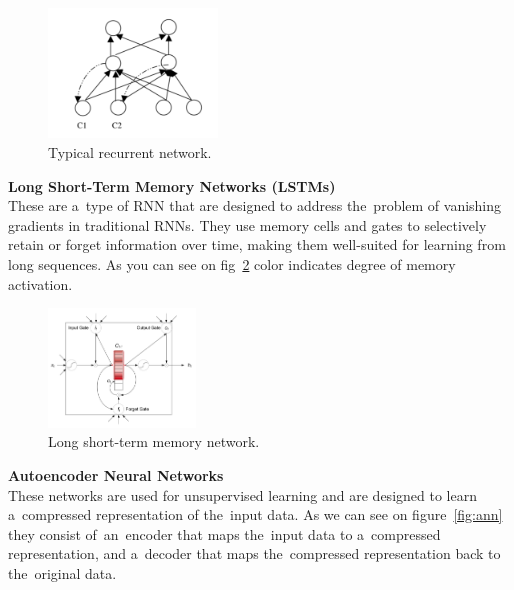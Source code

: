 \documentclass[12pt]{article}
\begin{document}
    \begin{center}
        \begin{figure}[!ht]
            \centering
            \includegraphics[width=0.4\textwidth]{figures/rn}
            \caption{Typical recurrent network. \cite{medsker2001recurrent}}
            \label{fig:rn}
        \end{figure}
    \end{center}
    \textbf{Long Short-Term Memory Networks (LSTMs)}\\
    These are a~type of RNN that are designed to address the~problem of vanishing gradients in traditional RNNs. They use memory cells and gates to selectively retain or forget information over time, making them well-suited for learning from long sequences. As you can see on fig~\ref{fig:ltmn} color indicates degree of memory activation.
    \begin{center}
        \begin{figure}[!ht]
            \centering
            \includegraphics[width=0.35\textwidth]{figures/ltmn}
            \caption{Long short-term memory network. \cite{cheng2016long}}
            \label{fig:ltmn}
        \end{figure}
    \end{center}
    \textbf{Autoencoder Neural Networks}\\
    These networks are used for unsupervised learning and are designed to learn a~compressed representation of the~input data. As we can see on figure~\ref{fig:ann} they consist of~an~encoder that maps the~input data to a~compressed representation, and a~decoder that maps the~compressed representation back to the~original data.
\end{document}
